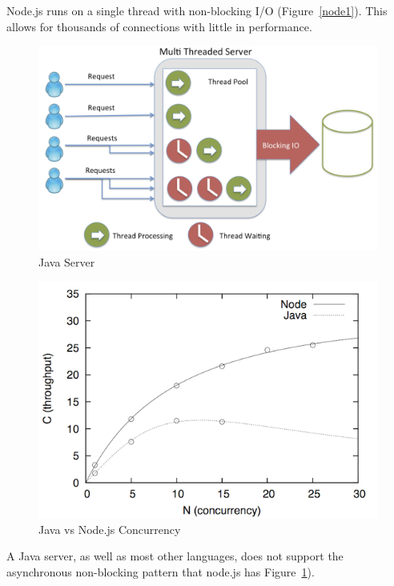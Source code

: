 \documentclass[12pt, letterpaper]{report}
\begin{document}
\par
Node.js runs on a single thread with non-blocking I/O (Figure~\ref{node1}).  This allows for thousands of connections with little in performance.

\begin{figure}[htp]
\centering
\includegraphics[scale=0.3]{threading_java.png}
\caption{Java Server \cite{fullStackJS}}
\label{node2}
\end{figure}



\begin{figure}[htp]
\centering
\includegraphics[scale=3.0]{javavsnodejs.png}
\caption{Java vs Node.js Concurrency \cite{javaVSnode}}
\end{figure}

\par
A Java server, as well as most other languages, does not support the asynchronous non-blocking pattern that node.js has Figure~\ref{node2}).
\end{document}
